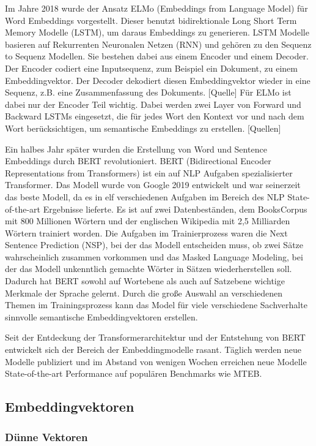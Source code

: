 Im Jahre 2018 wurde der Ansatz ELMo (Embeddings from Language Model) für Word Embeddings vorgestellt.
Dieser benutzt bidirektionale Long Short Term Memory Modelle (LSTM), um daraus Embeddings zu generieren.
LSTM Modelle basieren auf Rekurrenten Neuronalen Netzen (RNN) und gehören zu den Sequenz to Sequenz Modellen. 
Sie bestehen dabei aus einem Encoder und einem Decoder.
Der Encoder codiert eine Inputsequenz, zum Beispiel ein Dokument, zu einem Embeddingvektor. 
Der Decoder dekodiert diesen Embeddingvektor wieder in eine Sequenz, z.B. eine Zusammenfassung des Dokuments. [Quelle]
Für ELMo ist dabei nur der Encoder Teil wichtig.
Dabei werden zwei Layer von Forward und Backward LSTMs eingesetzt, die für jedes Wort den Kontext vor und nach dem Wort berücksichtigen, um semantische Embeddings zu erstellen. [Quellen]

Ein halbes Jahr später wurden die Erstellung von Word und Sentence Embeddings durch BERT revolutioniert.
BERT (Bidirectional Encoder Representations from Transformers) \cite{devlin2019} ist ein auf NLP Aufgaben spezialisierter Transformer.
Das Modell wurde von Google 2019 entwickelt und war seinerzeit das beste Modell, da es in elf verschiedenen Aufgaben im Bereich des NLP State-of-the-art Ergebnisse lieferte.
Es ist auf zwei Datenbeständen, dem BooksCorpus mit 800 Millionen Wörtern und der englischen Wikipedia mit 2,5 Milliarden Wörtern trainiert worden. 
Die Aufgaben im Trainierprozess waren die Next Sentence Prediction (NSP), bei der das Modell entscheiden muss, ob zwei Sätze wahrscheinlich zusammen vorkommen und das Masked Language Modeling, bei der das Modell unkenntlich gemachte Wörter in Sätzen wiederherstellen soll.
Dadurch hat BERT sowohl auf Wortebene als auch auf Satzebene wichtige Merkmale der Sprache gelernt.
Durch die große Auswahl an verschiedenen Themen im Trainingsprozess kann das Model für viele verschiedene Sachverhalte sinnvolle semantische Embeddingvektoren erstellen.
\cite{devlin2019}


Seit der Entdeckung der Transformerarchitektur und der Entstehung von BERT entwickelt sich der Bereich der Embeddingmodelle rasant.
Täglich werden neue Modelle publiziert und im Abstand von wenigen Wochen erreichen neue Modelle State-of-the-art Performance auf populären Benchmarks wie MTEB.  


\subsection{Embeddingvektoren}

\subsubsection{Dünne Vektoren}

